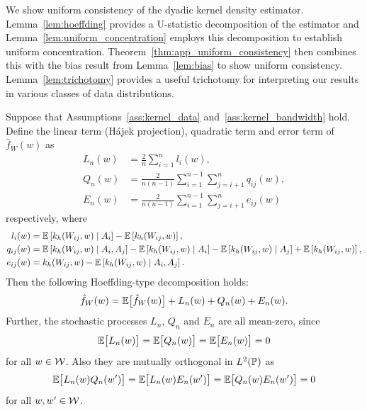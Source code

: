 We show uniform consistency of the
dyadic kernel density estimator.
Lemma~\ref{lem:hoeffding}
provides a U-statistic decomposition of the estimator
and Lemma~\ref{lem:uniform_concentration}
employs this decomposition to establish
uniform concentration.
Theorem~\ref{thm:app_uniform_consistency}
then combines this with the bias result from Lemma~\ref{lem:bias}
to show uniform consistency.
Lemma~\ref{lem:trichotomy} provides a useful trichotomy for
interpreting our results in various classes of data distributions.

\begin{lemma}
  \label{lem:hoeffding}

  Suppose that Assumptions~\ref{ass:kernel_data}
  and~\ref{ass:kernel_bandwidth}
  hold.
  Define the linear term
  (H\'{a}jek projection),
  quadratic term
  and error term
  of $\hat f_W(w)$ as
  \begin{align*}
    L_n(w)
    &=
    \frac{2}{n} \sum_{i=1}^n
    l_i(w), \\
    Q_n(w)
    &=
    \frac{2}{n(n-1)}
    \sum_{i=1}^{n-1}
    \sum_{j=i+1}^{n}
    q_{i j}(w), \\
    E_n(w)
    &=
    \frac{2}{n(n-1)}
    \sum_{i=1}^{n-1}
    \sum_{j=i+1}^{n}
    e_{i j}(w)
  \end{align*}
  respectively, where
  \begin{align*}
    l_i(w)
    &=
    \E\left[k_h(W_{i j},w) \mid A_i\right] - \E\left[k_h(W_{i j},w)\right], \\
    q_{i j}(w)
    &=
    \E\left[k_h(W_{i j},w) \mid A_i, A_j\right]
    - \E\left[k_h(W_{i j},w) \mid A_i\right]
    - \E\left[k_h(W_{i j},w) \mid A_j\right]
    + \E\left[k_h(W_{i j},w)\right], \\
    e_{i j}(w)
    &=
    k_h(W_{i j},w)
    - \E\left[k_h(W_{i j},w) \mid A_i, A_j\right].
  \end{align*}
  Then the following Hoeffding-type decomposition holds:
  \begin{align*}
    \hat f_W(w)
    = \E\big[\hat f_W(w)\big]
    + L_n(w)
    + Q_n(w)
    + E_n(w).
  \end{align*}
  Further,
  the stochastic processes
  $L_n$, $Q_n$ and $E_n$
  are all mean-zero, since
  \begin{equation*}
    \E\big[L_n(w)\big]
    = \E\big[Q_n(w)\big]
    = \E\big[E_n(w)\big]
    = 0
  \end{equation*}
  for all $w \in \cW$.
  Also they are mutually orthogonal
  in $L^2(\P)$ as
  \begin{equation*}
    \E\big[
      L_n(w) Q_n(w')
    \big]
    = \E\big[
      L_n(w) E_n(w')
    \big]
    = \E\big[
      Q_n(w) E_n(w')
    \big]
    = 0
  \end{equation*}
  for all $w, w' \in \cW$.

\end{lemma}


